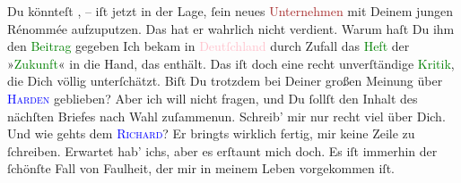                Du könnteſt \label{K_L02772-88v}\label{K_L02772-88h}, – iſt jetzt in der Lage, ſein neues
                  \textcolor{brown}{Unternehmen}{} mit Deinem
               jungen Rénommée aufzuputzen. Das hat er wahrlich nicht verdient. Warum haſt {\pb}Du ihm den \textcolor{green}{Beitrag}{} gegeben Ich bekam in \textcolor{pink}{Deutſchland}{}\ledrightnote{\textcolor{pink}{Deutschland}} durch Zufall
               das \textcolor{green}{Heft}{} der »\textcolor{green}{Zukunft}{}\ledrightnote{\textcolor{green}{Die Zukunft}}« in die Hand, das \label{K_L02772-8v}\label{K_L02772-8h} enthält. Das iſt doch eine recht unverſtändige \textcolor{green}{Kritik}{}\ledrightnote{\textcolor{green}{Theaternotizen [Liebelei]}}, die Dich völlig unterſchätzt. Biſt Du
               trotzdem bei Deiner großen Meinung über \textsc{\textcolor{blue}{Harden}{}\ledrightnote{\textcolor{blue}{Maximilian Harden}}} geblieben?\pend
           \pstart
           Aber ich will nicht fragen, und Du ſollſt den  Inhalt des nächſten Briefes nach {\pb} Wahl zuſammenun. Schreib’ mir nur recht viel über Dich.\pend
           \pstart
           Und wie gehts dem \textsc{\textcolor{blue}{Richard}{}\ledrightnote{\textcolor{blue}{Richard Beer-Hofmann}}}? Er bringts wirklich fertig, mir keine Zeile zu ſchreiben. Erwartet hab’ ichs,
               aber es erſtaunt mich doch. Es iſt immerhin der ſchönſte Fall von Faulheit, der mir
               in meinem Leben vorgekommen iſt.\pend
           \pstart
